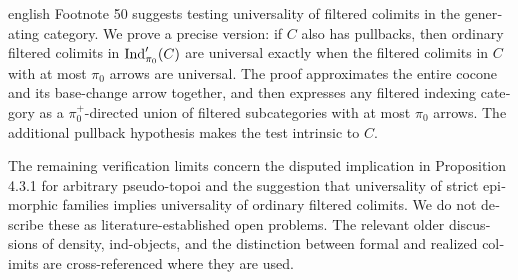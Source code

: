 \begin{otherlanguage}{english}
\begin{otherlanguage*}{english}
Footnote 50 suggests testing universality of filtered colimits in the generating category. We prove a precise version: if $C$ also has pullbacks, then ordinary filtered colimits in $\operatorname{Ind}'_{\pi_0}(C)$ are universal exactly when the filtered colimits in $C$ with at most $\pi_0$ arrows are universal. The proof approximates the entire cocone and its base-change arrow together, and then expresses any filtered indexing category as a $\pi_0^+$-directed union of filtered subcategories with at most $\pi_0$ arrows. The additional pullback hypothesis makes the test intrinsic to $C$.

The remaining verification limits concern the disputed implication in Proposition 4.3.1 for arbitrary pseudo-topoi and the suggestion that universality of strict epimorphic families implies universality of ordinary filtered colimits. We do not describe these as literature-established open problems. The relevant older discussions of density, ind-objects, and the distinction between formal and realized colimits are cross-referenced where they are used.
\end{otherlanguage*}
\end{otherlanguage}
\dgrchunkend
